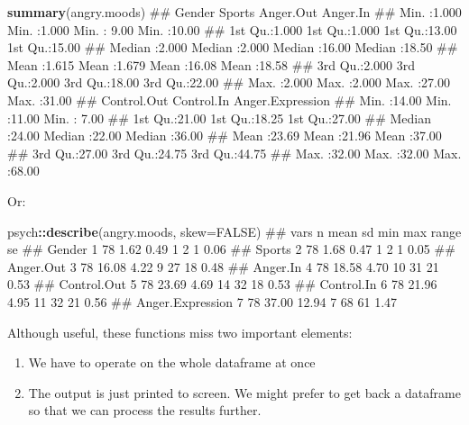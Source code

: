 \documentclass[]{article}
\newenvironment{Shaded}{\begin{snugshade}}{\end{snugshade}}
\newcommand{\KeywordTok}[1]{\textcolor[rgb]{0.13,0.29,0.53}{\textbf{#1}}}
\newcommand{\DataTypeTok}[1]{\textcolor[rgb]{0.13,0.29,0.53}{#1}}
\newcommand{\OtherTok}[1]{\textcolor[rgb]{0.56,0.35,0.01}{#1}}
\newcommand{\OperatorTok}[1]{\textcolor[rgb]{0.81,0.36,0.00}{\textbf{#1}}}
\newcommand{\NormalTok}[1]{#1}
\providecommand{\tightlist}{%
  \setlength{\itemsep}{0pt}\setlength{\parskip}{0pt}}
\theoremstyle{definition}
\theoremstyle{definition}
\theoremstyle{definition}
\theoremstyle{remark}
\begin{document}
\begin{Shaded}
\begin{Highlighting}[]
\KeywordTok{summary}\NormalTok{(angry.moods)}
\NormalTok{##      Gender          Sports        Anger.Out        Anger.In    }
\NormalTok{##  Min.   :1.000   Min.   :1.000   Min.   : 9.00   Min.   :10.00  }
\NormalTok{##  1st Qu.:1.000   1st Qu.:1.000   1st Qu.:13.00   1st Qu.:15.00  }
\NormalTok{##  Median :2.000   Median :2.000   Median :16.00   Median :18.50  }
\NormalTok{##  Mean   :1.615   Mean   :1.679   Mean   :16.08   Mean   :18.58  }
\NormalTok{##  3rd Qu.:2.000   3rd Qu.:2.000   3rd Qu.:18.00   3rd Qu.:22.00  }
\NormalTok{##  Max.   :2.000   Max.   :2.000   Max.   :27.00   Max.   :31.00  }
\NormalTok{##   Control.Out      Control.In    Anger.Expression}
\NormalTok{##  Min.   :14.00   Min.   :11.00   Min.   : 7.00   }
\NormalTok{##  1st Qu.:21.00   1st Qu.:18.25   1st Qu.:27.00   }
\NormalTok{##  Median :24.00   Median :22.00   Median :36.00   }
\NormalTok{##  Mean   :23.69   Mean   :21.96   Mean   :37.00   }
\NormalTok{##  3rd Qu.:27.00   3rd Qu.:24.75   3rd Qu.:44.75   }
\NormalTok{##  Max.   :32.00   Max.   :32.00   Max.   :68.00}
\end{Highlighting}
\end{Shaded}

Or:

\begin{Shaded}
\begin{Highlighting}[]
\NormalTok{psych}\OperatorTok{::}\KeywordTok{describe}\NormalTok{(angry.moods, }\DataTypeTok{skew=}\OtherTok{FALSE}\NormalTok{)}
\NormalTok{##                  vars  n  mean    sd min max range   se}
\NormalTok{## Gender              1 78  1.62  0.49   1   2     1 0.06}
\NormalTok{## Sports              2 78  1.68  0.47   1   2     1 0.05}
\NormalTok{## Anger.Out           3 78 16.08  4.22   9  27    18 0.48}
\NormalTok{## Anger.In            4 78 18.58  4.70  10  31    21 0.53}
\NormalTok{## Control.Out         5 78 23.69  4.69  14  32    18 0.53}
\NormalTok{## Control.In          6 78 21.96  4.95  11  32    21 0.56}
\NormalTok{## Anger.Expression    7 78 37.00 12.94   7  68    61 1.47}
\end{Highlighting}
\end{Shaded}

Although useful, these functions miss two important elements:

\begin{enumerate}
\def\labelenumi{\arabic{enumi}.}
\tightlist
\item
  We have to operate on the whole dataframe at once
\item
  The output is just printed to screen. We might prefer to get back a
  dataframe so that we can process the results further.
\end{enumerate}
\end{document}
